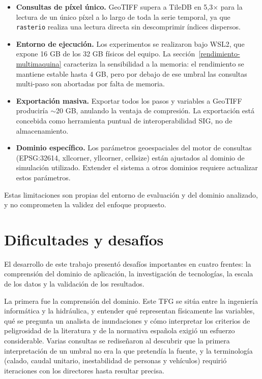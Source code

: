 \begin{itemize}
\item \textbf{Consultas de píxel único.} GeoTIFF supera a TileDB en 5,3$\times$ para la lectura de un único píxel a lo largo de toda la serie temporal, ya que \texttt{rasterio} realiza una lectura directa sin descomprimir índices dispersos.

\item \textbf{Entorno de ejecución.} Los experimentos se realizaron bajo WSL2, que expone 16 GB de los 32 GB físicos del equipo. La sección~\ref{rendimiento-multimaquina} caracteriza la sensibilidad a la memoria: el rendimiento se mantiene estable hasta 4 GB, pero por debajo de ese umbral las consultas multi-paso son abortadas por falta de memoria.

\item \textbf{Exportación masiva.} Exportar todos los pasos y variables a GeoTIFF produciría $\sim$20 GB, anulando la ventaja de compresión. La exportación está concebida como herramienta puntual de interoperabilidad SIG, no de almacenamiento.

\item \textbf{Dominio específico.} Los parámetros geoespaciales del motor de consultas (EPSG:32614, xllcorner, yllcorner, cellsize) están ajustados al dominio de simulación utilizado. Extender el sistema a otros dominios requiere actualizar estos parámetros.
\end{itemize}

Estas limitaciones son propias del entorno de evaluación y del dominio analizado, y no comprometen la validez del enfoque propuesto.

\section{Dificultades y desafíos}\label{dificultades-y-desafios}

El desarrollo de este trabajo presentó desafíos importantes en cuatro frentes: la comprensión del dominio de aplicación, la investigación de tecnologías, la escala de los datos y la validación de los resultados.

La primera fue la comprensión del dominio. Este TFG se sitúa entre la ingeniería informática y la hidráulica, y entender qué representan físicamente las variables, qué se pregunta un analista de inundaciones y cómo interpretar los criterios de peligrosidad de la literatura \cite{russo2013, xia2011vehicles, xia2014} y de la normativa española exigió un esfuerzo considerable. Varias consultas se rediseñaron al descubrir que la primera interpretación de un umbral no era la que pretendía la fuente, y la terminología (calado, caudal unitario, inestabilidad de personas y vehículos) requirió iteraciones con los directores hasta resultar precisa.

